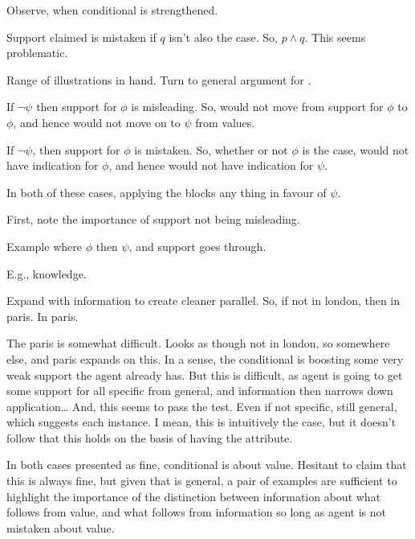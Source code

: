 \begin{note}
  Observe, when conditional is strengthened.

  Support claimed is mistaken if \(q\) isn't also the case.
  So, \(p \land q\).
  This seems problematic.
\end{note}


\newpage

\begin{note}
  Range of illustrations in hand.
  Turn to general argument for \nI{}.
\end{note}


\begin{note}

  If \(\lnot\psi\) then support for \(\phi\) is misleading.
  So, would not move from support for \(\phi\) to \(\phi\), and hence would not move on to \(\psi\) from values.


  If \(\lnot\psi\), then support for \(\phi\) is mistaken.
  So, whether or not \(\phi\) is the case, would not have indication for \(\phi\), and hence would not have indication for \(\psi\).

  In both of these cases, applying the \eit{} blocks any thing in favour of \(\psi\).
  
\end{note}

\begin{note}
  First, note the importance of support not being misleading.

  Example where \(\phi\) then \(\psi\), and support goes through.

  E.g., knowledge.

  Expand with information to create cleaner parallel.
  So, if not in london, then in paris.
  In paris.

  The paris is somewhat difficult.
  Looks as though not in london, so somewhere else, and paris expands on this.
  In a sense, the conditional is boosting some very weak support the agent already has.
  {
    But this is difficult, as agent is going to get some support for all specific from general, and information then narrows down application\dots
    And, this seems to pass the test.
    Even if not specific, still general, which suggests each instance.
    I mean, this is intuitively the case, but it doesn't follow that this holds on the basis of having the attribute.
  }

  In both cases presented as fine, conditional is about value.
  Hesitant to claim that this is always fine, but given that \nI{} is general, a pair of examples are sufficient to highlight the importance of the distinction between information about what follows from value, and what follows from information so long as agent is not mistaken about value.
\end{note}

